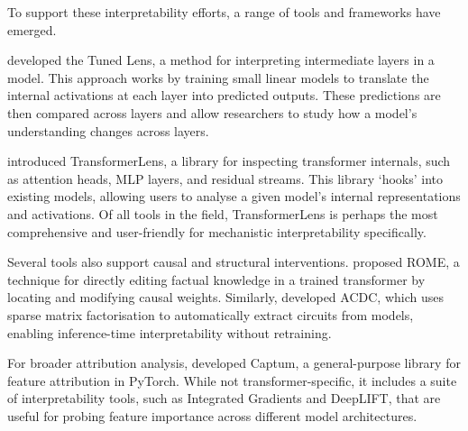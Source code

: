 To support these interpretability efforts, a range of tools and frameworks have emerged.

\citet{belrose2023eliciting} developed the Tuned Lens, a method for interpreting intermediate layers in a model. This approach works by training small linear models to translate the internal activations at each layer into predicted outputs. These predictions are then compared across layers and allow researchers to study how a model's understanding changes across layers.

\citet{nanda2022transformerlens} introduced TransformerLens, a library for inspecting transformer internals, such as attention heads, MLP layers, and residual streams. This library `hooks' into existing models, allowing users to analyse a given model's internal representations and activations. Of all tools in the field, TransformerLens is perhaps the most comprehensive and user-friendly for mechanistic interpretability specifically.

Several tools also support causal and structural interventions. \citet{meng2022locating} proposed ROME, a technique for directly editing factual knowledge in a trained transformer by locating and modifying causal weights. Similarly, \citet{conmy2023towards} developed ACDC, which uses sparse matrix factorisation to automatically extract circuits from models, enabling inference-time interpretability without retraining.

For broader attribution analysis, \citet{kokhlikyan2020captum} developed Captum, a general-purpose library for feature attribution in PyTorch. While not transformer-specific, it includes a suite of interpretability tools, such as Integrated Gradients and DeepLIFT, that are useful for probing feature importance across different model architectures.



